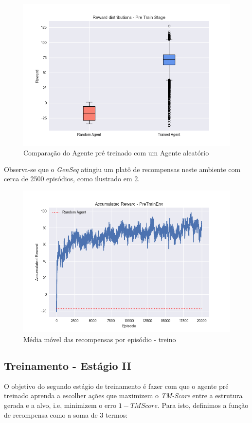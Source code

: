   \begin{figure}[H]
    \centering
    \includegraphics[width=.8\linewidth]{figuras/plot_box_pre_train_reward.jpg}  
    \caption{Comparação do Agente pré treinado com um Agente aleatório}
    \label{fig:box-pre-train}
  \end{figure}

Observa-se que o \textit{GenSeq} atingiu um platô de recompensas neste ambiente com cerca de 2500 episódios, como ilustrado em 
\ref{fig:rew_per_ep_pretrain}.

  \begin{figure}[H]
    \centering
    \includegraphics[width=.8\linewidth]{figuras/plot_pre_train_reward.jpg}    
    \caption{Média móvel das recompensas por episódio - treino}
    \label{fig:rew_per_ep_pretrain}
  \end{figure}


\subsection{Treinamento - Estágio II}
\label{subsection:stage2}
O objetivo do segundo estágio de treinamento é fazer com que o agente pré treinado aprenda a escolher ações
que maximizem o \textit{TM-Score} entre a estrutura gerada e a alvo, 
i.e, minimizem o erro $1-TMScore$.
Para isto, definimos a função de recompensa como a soma de 3 termos: 

